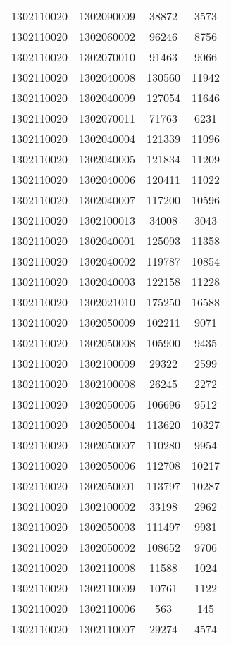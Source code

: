 \begin{longtable}[h]{llcc}
		1302110020 & 1302090009 & 38872 & 3573\\
		1302110020 & 1302060002 & 96246 & 8756\\
		1302110020 & 1302070010 & 91463 & 9066\\
		1302110020 & 1302040008 & 130560 & 11942\\
		1302110020 & 1302040009 & 127054 & 11646\\
		1302110020 & 1302070011 & 71763 & 6231\\
		1302110020 & 1302040004 & 121339 & 11096\\
		1302110020 & 1302040005 & 121834 & 11209\\
		1302110020 & 1302040006 & 120411 & 11022\\
		1302110020 & 1302040007 & 117200 & 10596\\
		1302110020 & 1302100013 & 34008 & 3043\\
		1302110020 & 1302040001 & 125093 & 11358\\
		1302110020 & 1302040002 & 119787 & 10854\\
		1302110020 & 1302040003 & 122158 & 11228\\
		1302110020 & 1302021010 & 175250 & 16588\\
		1302110020 & 1302050009 & 102211 & 9071\\
		1302110020 & 1302050008 & 105900 & 9435\\
		1302110020 & 1302100009 & 29322 & 2599\\
		1302110020 & 1302100008 & 26245 & 2272\\
		1302110020 & 1302050005 & 106696 & 9512\\
		1302110020 & 1302050004 & 113620 & 10327\\
		1302110020 & 1302050007 & 110280 & 9954\\
		1302110020 & 1302050006 & 112708 & 10217\\
		1302110020 & 1302050001 & 113797 & 10287\\
		1302110020 & 1302100002 & 33198 & 2962\\
		1302110020 & 1302050003 & 111497 & 9931\\
		1302110020 & 1302050002 & 108652 & 9706\\
		1302110020 & 1302110008 & 11588 & 1024\\
		1302110020 & 1302110009 & 10761 & 1122\\
		1302110020 & 1302110006 & 563 & 145\\
		1302110020 & 1302110007 & 29274 & 4574\\

\end{longtable}
